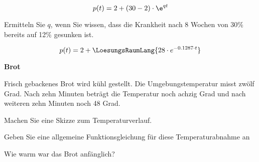 $$p(t) = 2 + (30-2)\cdot \e^{qt}$$

Ermitteln Sie $q$, wenn Sie wissen, dass die Krankheit nach 8 Wochen von 30\% bereits auf 12\% gesunken ist.

$$p(t) = 2 + \LoesungsRaumLang{28\cdot{}e^{-0.1287\cdot{}t}}$$


\platzFuerBerechnungenBisEndeSeite{}



\bbwActAufgabenNr{} \textbf{Brot}

Frisch gebackenes Brot wird kühl gestellt. Die Umgebungstemperatur
misst zwölf Grad. Nach zehn Minuten beträgt die Temperatur noch achzig Grad und
nach weiteren zehn Minuten noch 48 Grad.


\begin{bbwAufgabenBlock}
\item Machen Sie eine Skizze zum Temperaturverlauf.
  
\item Geben Sie eine allgemeine Funktionsgleichung für diese
  Temperaturabnahme an

\item Wie warm war das Brot anfänglich?

\end{bbwAufgabenBlock}  

\platzFuerBerechnungenBisEndeSeite{}


